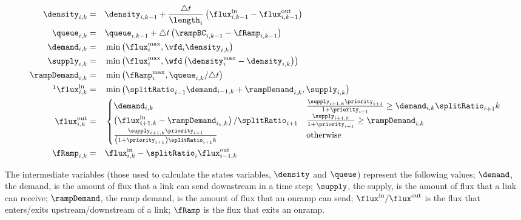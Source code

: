 \begin{equation}
\begin{aligned}
\label{eqn:system-of-equations}
\idx{\density}{i}{k} & = & &
\idx{\density}{i}{k-1} + \frac{\dt}{\length_i} \left(\idx{\fIn}{i}{k-1} - \idx{\fOut}{i}{k-1}\right)
\\
\idx{\queue}{i}{k} & = & &
\idx{\queue}{i}{k-1} + \dt \left(\idx{\rampBC}{i}{k-1} - \idx{\fRamp}{i}{k-1}\right) \\
\idx{\demand}{i}{k} & = & &
\min\left( \fmfd_i, \vfd_i \idx{\density}{i}{k} \right)
\\
\idx{\supply}{i}{k} & = & &
\min\left(\fmfd_i, \wfd \left( \pmfd_i - \idx{\density}{i}{k} \right)\right)
\\
\idx{\rampDemand}{i}{k} & = & &
\min\left( \rampMax_i, \idx{\queue}{i}{k} / \dt \right)
\\
\footnotemark
\idx{\fIn}{i}{k} & = & &
\min\left( \splitRatio_{i-1} \idx{\demand}{i-1}{k} + \idx{\rampDemand}{i}{k}, \idx{\supply}{i}{k} \right)
\\
\idx{\fOut}{i}{k} & = & &
\begin{cases}
\idx{\demand}{i}{k} &
\frac{\idx{\supply}{i+1}{k}\priority_{i+1}}{1 + \priority_{i+1}} \ge \idx{\demand}{i}{k}\splitRatio_{i+1}{k} \\
\left(\idx{\fIn}{i+1}{k} - \idx{\rampDemand}{i_1}{k}\right) / \splitRatio_{i +1} & 
\frac{\idx{\supply}{i+1}{k}}{1 + \priority_{i+1}} \ge \idx{\rampDemand}{i}{k} \\
\frac{\idx{\supply}{i+1}{k}\priority_{i+1}}{\left(1 + \priority_{i+1}\right)\splitRatio_{i+1}{k}} &
\text{otherwise}
\end{cases}
\\
\idx{\fRamp}{i}{k} & = & &
\idx{\fIn}{i}{k} - \splitRatio_{i} \idx{\fOut}{i-1}{k}
\end{aligned}
\end{equation}


The intermediate variables (those used to calculate the states variables, $\density$ and $\queue$) represent the following values; $\demand$, the demand, is the amount of flux that a link can send downstream in a time step; $\supply$, the supply, is the amount of flux that a link can receive; $\rampDemand$, the ramp demand, is the amount of flux that an onramp can send; $\fIn/\fOut$ is the flux that enters/exits upstream/downstream of a link; $\fRamp$ is the flux that exits an onramp.

